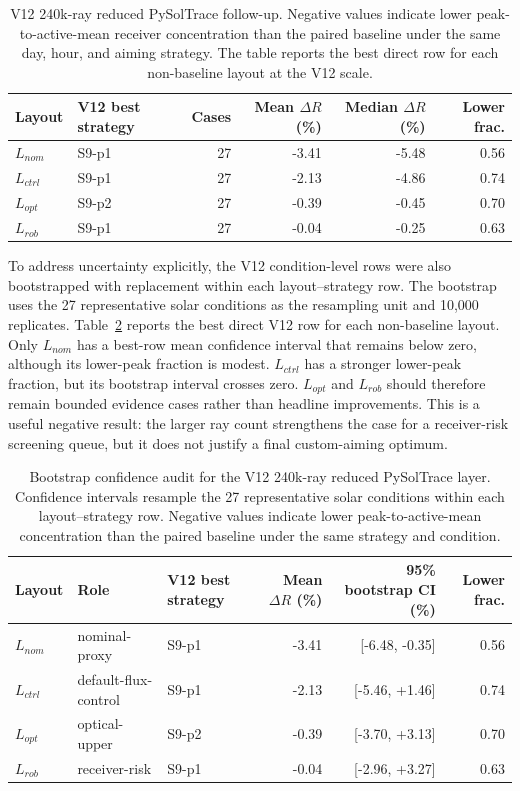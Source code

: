\documentclass[final,3p,times]{elsarticle}
\begin{document}
\begin{table}[t]
\centering
\caption{V12 240k-ray reduced PySolTrace follow-up. Negative values indicate lower peak-to-active-mean receiver concentration than the paired baseline under the same day, hour, and aiming strategy. The table reports the best direct row for each non-baseline layout at the V12 scale.}
\label{tab:v12-followup}
\scriptsize
\begin{tabular*}{\textwidth}{@{\extracolsep{\fill}}llrrrr@{}}
\toprule
Layout & V12 best strategy & Cases & Mean $\Delta R$ (\%) & Median $\Delta R$ (\%) & Lower frac. \\
\midrule
$L_{nom}$ & S9-p1 & 27 & -3.41 & -5.48 & 0.56 \\
$L_{ctrl}$ & S9-p1 & 27 & -2.13 & -4.86 & 0.74 \\
$L_{opt}$ & S9-p2 & 27 & -0.39 & -0.45 & 0.70 \\
$L_{rob}$ & S9-p1 & 27 & -0.04 & -0.25 & 0.63 \\
\bottomrule
\end{tabular*}
\end{table}

To address uncertainty explicitly, the V12 condition-level rows were also bootstrapped with replacement within each layout--strategy row. The bootstrap uses the 27 representative solar conditions as the resampling unit and 10,000 replicates. Table~\ref{tab:v12-bootstrap} reports the best direct V12 row for each non-baseline layout. Only $L_{nom}$ has a best-row mean confidence interval that remains below zero, although its lower-peak fraction is modest. $L_{ctrl}$ has a stronger lower-peak fraction, but its bootstrap interval crosses zero. $L_{opt}$ and $L_{rob}$ should therefore remain bounded evidence cases rather than headline improvements. This is a useful negative result: the larger ray count strengthens the case for a receiver-risk screening queue, but it does not justify a final custom-aiming optimum.

\begin{table}[t]
\centering
\caption{Bootstrap confidence audit for the V12 240k-ray reduced PySolTrace layer. Confidence intervals resample the 27 representative solar conditions within each layout--strategy row. Negative values indicate lower peak-to-active-mean concentration than the paired baseline under the same strategy and condition.}
\label{tab:v12-bootstrap}
\scriptsize
\begin{tabular*}{\textwidth}{@{\extracolsep{\fill}}lllrrr@{}}
\toprule
Layout & Role & V12 best strategy & Mean $\Delta R$ (\%) & 95\% bootstrap CI (\%) & Lower frac. \\
\midrule
$L_{nom}$ & nominal-proxy & S9-p1 & -3.41 & [-6.48, -0.35] & 0.56 \\
$L_{ctrl}$ & default-flux-control & S9-p1 & -2.13 & [-5.46, +1.46] & 0.74 \\
$L_{opt}$ & optical-upper & S9-p2 & -0.39 & [-3.70, +3.13] & 0.70 \\
$L_{rob}$ & receiver-risk & S9-p1 & -0.04 & [-2.96, +3.27] & 0.63 \\
\bottomrule
\end{tabular*}
\end{table}
\FloatBarrier
\end{document}
